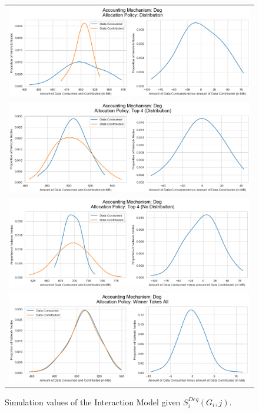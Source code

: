 \begin{figure}[H]
\begin{center}
\begin{tabular}{c}
\includegraphics[scale=0.8]{Acc_Deg_Dist.png} \\
\includegraphics[scale=0.8]{Acc_Deg_Top_4_Dist.png} \\
\includegraphics[scale=0.8]{Acc_Deg_Top_4_No_Dist.png} \\
\includegraphics[scale=0.8]{Acc_Deg_Winner.png} \\
\end{tabular}
\caption{Simulation values of the Interaction Model given $S^{Deg}_i(G_i,j)$.}
\label{fig:Acc_Deg_Sim_Values}
\end{center}
\end{figure}

